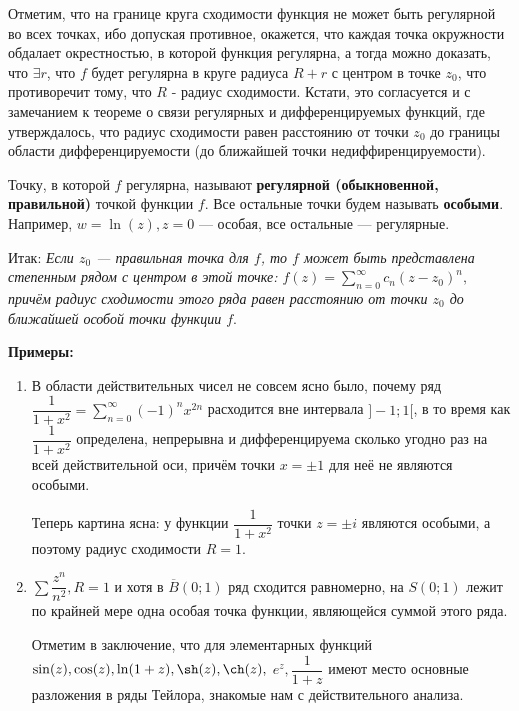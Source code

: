 \documentclass[a4paper, 12pt]{report}
\begin{document}
Отметим, что на границе круга сходимости функция не может быть регулярной во всех точках, ибо допуская противное, окажется, что каждая точка окружности обдалает окрестностью, в которой функция регулярна, а тогда можно доказать, что $\exists r$, что $f$ будет регулярна в круге радиуса $R + r$ с центром в точке $z_0$, что противоречит тому, что $R$ - радиус сходимости. Кстати, это согласуется и с замечанием к теореме о связи регулярных и дифференцируемых функций, где утверждалось, что радиус сходимости равен расстоянию от точки $z_0$ до границы области дифференцируемости (до ближайшей точки недиффиренцируемости).
\par\bigskip
Точку, в которой $f$ регулярна, называют \textbf{регулярной (обыкновенной, правильной)} точкой функции $f$. Все остальные точки будем называть \textbf{особыми}. Например, $w = \ln(z), z = 0$ --- особая, все остальные --- регулярные.
\par\bigskip
Итак:\; \textit{Если $z_0$ --- правильная точка для $f$, то $f$ может быть представлена степенным рядом с центром в этой точке: $f(z) = \sum\limits_{n=0}^{\infty}c_n(z - z_0)^{n},$ причём радиус сходимости этого ряда равен расстоянию от точки $z_0$ до ближайшей особой точки функции $f$}.
\par\bigskip
\textbf{Примеры: }
\begin{enumerate}
    \item  В области действительных чисел не совсем ясно было, почему ряд $\dfrac{1}{1 + x^2} = \sum\limits_{n=0}^{\infty}(-1)^n x^{2n}$ расходится вне интервала $]-1; 1[$, в то время как $\dfrac{1}{1 + x^2}$ определена, непрерывна и дифференцируема сколько угодно раз на всей действительной оси, причём точки $x = \pm 1$ для неё не являются особыми. \par Теперь картина ясна: у функции $\dfrac{1}{1 + x^2}$ точки $z = \pm i$ являются особыми, а поэтому радиус сходимости $R = 1$.
    
    \item $\sum\dfrac{z^n}{n^2}, R = 1$ и хотя в $\overline{B}(0; 1)$ ряд сходится равномерно, на $S(0; 1)$ лежит по крайней мере одна особая точка функции, являющейся суммой этого ряда.
    \par

    Отметим в заключение, что для элементарных функций $\sin(z), \cos(z), \ln(1 + z), \sh(z), \ch(z),$
    $ e^z, \dfrac{1}{1 + z}$ имеют место основные разложения в ряды Тейлора, знакомые нам с действительного анализа.
\end{enumerate}
\end{document}
